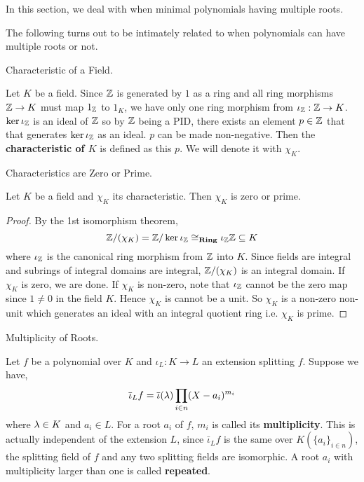 \documentclass[../book.tex]{subfiles}
\begin{document}
In this section, we deal with when minimal polynomials having multiple roots.

\begin{rmk}
    The following turns out to be intimately related to when
    polynomials can have multiple roots or not.
\end{rmk}

\begin{dfn} Characteristic of a Field.
    
    Let $K$ be a field. 
    Since $\mathbb{Z}$ is generated by $1$ as a ring
    and all ring morphisms $\mathbb{Z} \to K$ must map $1_{\mathbb{Z}}$ to $1_K$,
    we have only one ring morphism from $\iota_{\mathbb{Z}} : \mathbb{Z} \to K$. 
    $\ker \iota_{\mathbb{Z}}$ is an ideal of $\mathbb{Z}$ so by $\mathbb{Z}$ being a PID,
    there exists an element $p \in \mathbb{Z}$
    that that generates $\ker \iota_{\mathbb{Z}}$ as an ideal.
    $p$ can be made non-negative. 
    Then the \textbf{characteristic of $K$} is defined as this $p$. 
    We will denote it with $\chi_K$. 
\end{dfn}
\begin{thm} Characteristics are Zero or Prime.
    
    Let $K$ be a field and $\chi_K$ its characteristic.
    Then $\chi_K$ is zero or prime. 
\end{thm}
\begin{proof}
    By the 1st isomorphism theorem, 
    \[ \mathbb{Z}/ (\chi_K) = \mathbb{Z} / \ker \iota_{\mathbb{Z}} \cong_{\mathbf{Ring}} \iota_{\mathbb{Z}} \mathbb{Z} \subseteq K\]
    where $\iota_{\mathbb{Z}}$ is the canonical ring morphism from $\mathbb{Z}$ into $K$.
    Since fields are integral and subrings of integral domains are integral,
    $\mathbb{Z} / (\chi_K)$ is an integral domain.
    If $\chi_K$ is zero, we are done.
    If $\chi_K$ is non-zero, note that $\iota_{\mathbb{Z}}$ cannot be the zero map
    since $1 \neq 0$ in the field $K$. 
    Hence $\chi_K$ is cannot be a unit. 
    So $\chi_K$ is a non-zero non-unit 
    which generates an ideal with an integral quotient ring
    i.e. $\chi_K$ is prime.
\end{proof}
\begin{dfn} Multiplicity of Roots.
    
    Let $f$ be a polynomial over $K$ and 
    $\iota_L : K \to L$ an extension splitting $f$.
    Suppose we have, \[
            \overline{\iota}_L f = \overline{\iota}(\lambda) \prod_{i\in n} (X - a_i)^{m_i}
    \]
    where $\lambda \in K$ and $a_i \in L$. 
    For a root $a_i$ of $f$, $m_i$ is called its \textbf{multiplicity}.
    This is actually independent of the extension $L$,
    since $\bar\iota_L f$ is the same over $K(\{a_i\}_{i\in n})$,
    the splitting field of $f$ and any two splitting fields are isomorphic. 
    A root $a_i$ with multiplicity larger than one is called \textbf{repeated}.
\end{dfn}
\end{document}
